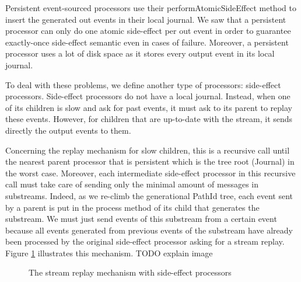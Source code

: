 Persistent event-sourced processors use their performAtomicSideEffect method to insert the generated out events in their local journal. We saw that a persistent processor can only do one
atomic side-effect per out event in order to guarantee exactly-once side-effect semantic even in cases of failure. Moreover, a persistent processor uses a lot of disk space as it stores
every output event in its local journal.

To deal with these problems, we define another type of processors: side-effect processors. Side-effect processors do not have a local journal. Instead, when one of its children is slow
and ask for past events, it must ask to its parent to replay these events. However, for children that are up-to-date with the stream, it sends directly the output events to them.

Concerning the replay mechanism for slow children, this is a recursive call until the nearest parent processor that is persistent which is the tree root (Journal) in the worst case. 
Moreover, each intermediate side-effect processor in this recursive call must take care of sending only the minimal amount of messages in substreams. Indeed,
as we re-climb the generational PathId tree, each event sent by a parent is put in the process method of its child that generates the substream. We must just send
events of this substream from a certain event because all events generated from previous events of the substream have already been processed by the original side-effect processor asking for a stream replay. 
Figure \ref{fig:sideeffectreclimb} illustrates this mechanism. TODO explain image

\begin{figure}[h]
  \begin{center} 
    \caption{The stream replay mechanism with side-effect processors}
    \label{fig:sideeffectreclimb}
  \end{center}
\end{figure}

